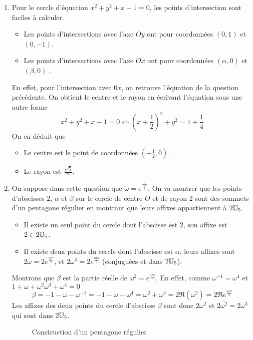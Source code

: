 \begin{enumerate}
 
\item Pour le cercle d'équation $x^2 +y^2+x-1=0$, les points d'intersection sont faciles à calculer.
\begin{itemize}
 \item Les points d'intersections avec l'axe $Oy$ ont pour coordonnées $(0,1)$ et $(0,-1)$.
 \item Les points d'intersections avec l'axe $Ox$ ont pour coordonnées $(\alpha,0)$ et $(\beta,0)$ .
\end{itemize}
En effet, pour l'intersection avec $0x$, on retrouve l'équation de la question précédente.\newline
On obtient le centre et le rayon en écrivant l'équation sous une autre forme
\begin{displaymath}
 x^2 +y^2+x-1 = 0 \Leftrightarrow (x+\frac{1}{2})^2 + y^2 = 1 + \frac{1}{4} 
\end{displaymath}
On en déduit que 
\begin{itemize}
 \item Le centre est le point de coordonnées $(-\frac{1}{2},0)$.
 \item Le rayon est $\frac{\sqrt 5}{2}$.
\end{itemize}

\item On suppose dans cette question que $\omega = e^{\frac{2i\pi}{5}}$. On va montrer que les points d'abscisses $2$, $\alpha$ et $\beta$ sur le cercle de centre $O$ et de rayon 2 sont des sommets d'un pentagone régulier en montrant que leurs affixes appartiennent à $2\mathbb{U}_5$.
\begin{itemize}
 \item Il existe un seul point du cercle dont l'abscisse est $2$, son affixe est $2\in 2\mathbb{U}_5$.
 \item Il existe deux points du cercle dont l'abscisse est $\alpha$, leurs affixes sont $2\omega = 2e^{\frac{2i\pi}{5}}$, et $2\omega^4 = 2e^{\frac{8i\pi}{5}}$ (conjuguées et dans $2\mathbb{U}_5$).
\end{itemize}
Montrons que $\beta$ est la partie réelle de $\omega^2=e^{\frac{4i\pi}{5}}$. En effet, comme $\omega^{-1}=\omega^{4}$ et $1+\omega +\omega^{2}\omega^{3}+\omega^{4}=0$
\begin{displaymath}
 \beta =-1 -\omega -\omega^{-1}=-1 -\omega -\omega^{4}=\omega^2 +\omega^{3} = 2\Re(\omega^2) = 2\Re e^{\frac{4i\pi}{5}}
\end{displaymath}
Les affixes des deux points du cercle d'abscisse $\beta$ sont donc $2\omega^2$ et $2\overline{\omega^2} = 2\omega^3$ qui sont dans $2\mathbb{U}_5$.
\begin{figure}
 \centering

\caption{Construction d'un pentagone régulier}
\label{fig:Cpentag_1}
\end{figure}


\end{enumerate}
